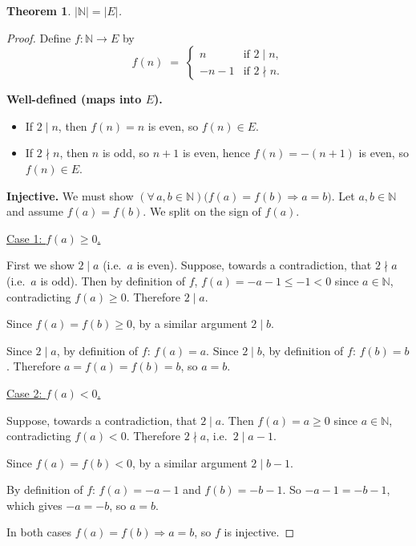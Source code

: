 \documentclass[11pt]{article}
\theoremstyle{defstyle}
\theoremstyle{thmstyle}
\newtheorem{theorem}{Theorem}[section]
\theoremstyle{notstyle}
\theoremstyle{cautionstyle}
\newcommand{\N}{\mathbb{N}}
\begin{document}
\begin{thmbox}
\begin{theorem}
$|\N| = |E|$.
\end{theorem}
\begin{proof}
Define $f\colon \N \to E$ by
\[
  f(n) \;=\;
  \begin{cases}
    n   & \text{if } 2 \mid n, \\
    -n-1 & \text{if } 2 \nmid n.
  \end{cases}
\]

\medskip
\noindent\textbf{Well-defined (maps into $E$).}
\begin{itemize}[leftmargin=2em, itemsep=2pt]
  \item If $2 \mid n$, then $f(n) = n$ is even, so $f(n) \in E$.
  \item If $2 \nmid n$, then $n$ is odd, so $n + 1$ is even, hence
        $f(n) = -(n+1)$ is even, so $f(n) \in E$.
\end{itemize}

\medskip
\noindent\textbf{Injective.}
We must show $(\forall\, a, b \in \N)\bigl(f(a) = f(b) \Rightarrow a = b\bigr)$.
Let $a, b \in \N$ and assume $f(a) = f(b)$.  We split on the sign of $f(a)$.

\medskip
\noindent\underline{Case 1: $f(a) \geq 0$.}

First we show $2 \mid a$ (i.e.\ $a$ is even).
Suppose, towards a contradiction, that $2 \nmid a$ (i.e.\ $a$ is odd).
Then by definition of $f$, $f(a) = -a - 1 \leq -1 < 0$ since $a \in \N$,
contradicting $f(a) \geq 0$.  Therefore $2 \mid a$.

Since $f(a) = f(b) \geq 0$, by a similar argument $2 \mid b$.

Since $2 \mid a$, by definition of $f$: $f(a) = a$.
Since $2 \mid b$, by definition of $f$: $f(b) = b$.
Therefore $a = f(a) = f(b) = b$, so $\boxed{a = b}$.

\medskip
\noindent\underline{Case 2: $f(a) < 0$.}

Suppose, towards a contradiction, that $2 \mid a$.
Then $f(a) = a \geq 0$ since $a \in \N$, contradicting $f(a) < 0$.
Therefore $2 \nmid a$, i.e.\ $2 \mid a - 1$.

Since $f(a) = f(b) < 0$, by a similar argument $2 \mid b - 1$.

By definition of $f$: $f(a) = -a - 1$ and $f(b) = -b - 1$.
So $-a - 1 = -b - 1$, which gives $-a = -b$, so $\boxed{a = b}$.

\medskip
In both cases $f(a) = f(b) \Rightarrow a = b$, so $f$ is injective.


\end{proof}
\end{thmbox}
\end{document}
